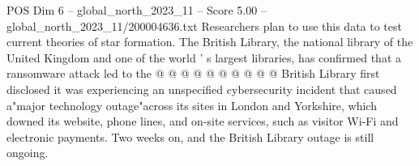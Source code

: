 \begin{textsample}{POS Dim 6 – global\_north\_2023\_11 – Score 5.00 – global\_north\_2023\_11/200004636.txt}
Researchers plan to use this data to test current theories of star formation.
The British Library, the national library of the United Kingdom and one of the world ' s largest libraries, has confirmed that a ransomware attack led to the @ @ @ @ @ @ @ @ @ @ British Library first disclosed it was experiencing an unspecified cybersecurity incident that caused a"major technology outage"across its sites in London and Yorkshire, which downed its website, phone lines, and on-site services, such as visitor Wi-Fi and electronic payments.
Two weeks on, and the British Library outage is still ongoing.

\end{textsample}

